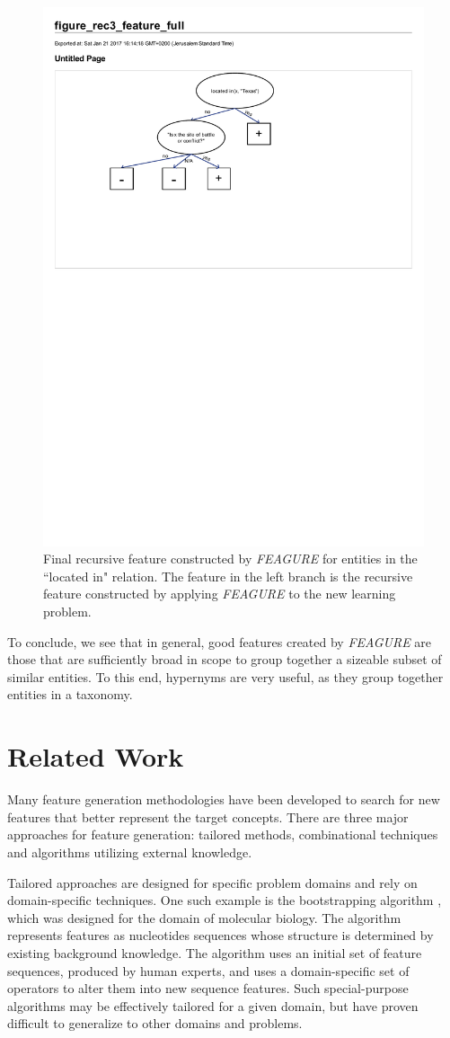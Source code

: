 \documentclass[twoside,11pt]{article}
\theoremstyle{definition}
\begin{document}
\begin{figure}[!h]
	\centering
	\includegraphics[width=0.6\linewidth]{figure_rec3_feature_full}
	\caption{Final recursive feature constructed by \emph{FEAGURE} for entities in the ``located in" relation. The feature in the left branch is the recursive feature constructed by applying \emph{FEAGURE} to the new learning problem.}
	\label{fig:figure_rec3_feature_full}
\end{figure}

To conclude, we see that in general, good features created by \emph{FEAGURE} are those that are sufficiently broad in scope to group together a sizeable subset of similar entities. To this end, hypernyms are very useful, as they group together entities in a taxonomy. 

\section{Related Work}

Many feature generation methodologies have been developed to search for new features that better represent the target concepts. There are three major approaches for feature generation: tailored methods, combinational techniques and algorithms utilizing external knowledge.

Tailored approaches \cite{sutton1991learning,hirsh1994bootstrapping} are designed for specific problem domains and rely on domain-specific techniques. %
One such example is the bootstrapping algorithm \cite{hirsh1994bootstrapping}, which was designed for the domain of molecular biology. The algorithm represents features as nucleotides sequences whose structure is determined by existing background knowledge. The algorithm uses an initial set of feature sequences, produced by human experts, and uses a domain-specific set of operators to alter them into new sequence features. 
Such special-purpose algorithms  may be effectively tailored for a given domain, but have proven difficult to generalize to other domains and problems.
\end{document}
